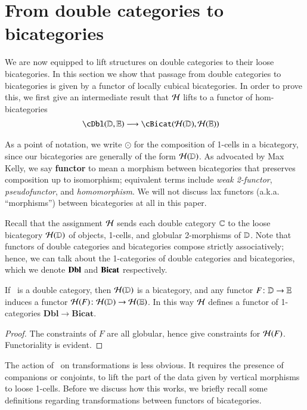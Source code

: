 \section{From double categories to bicategories}
\label{sec:1x1-to-bicat}

We are now equipped to lift structures on double categories to
their loose bicategories.  In this section we show that passage
from double categories to bicategories is given by a functor of locally cubical bicategories. In order to prove this, we first give an intermediate result that $\mathcal{H}$ lifts to a functor of hom-bicategories
\begin{align}
    \cDbl(\lD,\lE) &\too \cBicat(\cH(\lD),\cH(\lE))
\end{align}

As a point of notation, we write $\odot$ for the composition of
1-cells in a bicategory, since our bicategories are generally of the
form $\mathcal{H}(\mathbb{D})$.  As advocated by Max Kelly, we say \textbf{functor}
to mean a morphism between bicategories that preserves composition up
to isomorphism; equivalent terms include \emph{weak 2-functor},
\emph{pseudofunctor}, and \emph{homomorphism}.
We will not discuss lax functors (a.k.a. ``morphisms'') between bicategories at all in this paper.

Recall that the assignment $\mathcal{H}$ sends each double category $\mathbb{C}$ to the loose bicategory  $\mathcal{H}(\mathbb{D})$ of objects, 1-cells, and globular 2-morphisms of $\mathbb{D}$.  Note that functors of double categories and bicategories compose strictly associatively; hence, we can talk about the 1-categories of double categories and bicategories, which we denote ${\bf Dbl}$ and ${\bf Bicat}$ respectively.

\begin{thm}\label{thm:1-func}
 If \lD\ is a double category, then $\mathcal{H}(\mathbb{D})$ is a bicategory, and
  any functor $F\colon \mathbb{D}\to\mathbb{E}$ induces a functor $\mathcal{H}(F)\colon
  \mathcal{H}(\mathbb{D})\to\mathcal{H}(\mathbb{E})$.  In this way $\mathcal{H}$ defines a functor of
  1-categories $\mathbf{Dbl}\to \mathbf{Bicat}$.
\end{thm}
\begin{proof}
 The constraints of $F$ are all globular, hence give constraints for
  $\mathcal{H}(F)$.  Functoriality is evident.
\end{proof}

The action of \cH\ on transformations is less obvious. It
requires the presence of companions or conjoints, to lift the part of the data given by vertical morphisms to loose 1-cells. Before we discuss how this works, we briefly recall some definitions regarding transformations between functors of bicategories.

